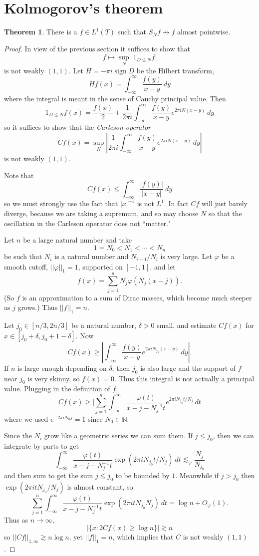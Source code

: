 \documentclass[12pt]{report}
\newcommand{\NN}{\mathbb{N}}
\DeclareMathOperator*{\sgn}{sign}
\newcommand{\dfn}[1]{\emph{#1}\index{#1}}
\theoremstyle{definition}
\newtheorem{theorem}{Theorem}[chapter]
\begin{document}
\section{Kolmogorov's theorem}
\begin{theorem}
There is a $f \in L^1(T)$ such that $S_Nf \not \to f$ almost pointwise.
\end{theorem}
\begin{proof}
In view of the previous section it suffices to show that
$$f \mapsto \sup_N |1_{D \leq N}f|$$
is not weakly $(1, 1)$.
Let $H = -\pi i \sgn D$ be the Hilbert transform,
$$Hf(x) = \int_{-\infty}^\infty \frac{f(y)}{x - y}~dy$$
where the integral is meant in the sense of Cauchy principal value. Then
$$1_{D \leq N}f(x) = \frac{f(x)}{2} + \frac{1}{2\pi i}\int_{-\infty}^\infty \frac{f(y)}{x - y}e^{2\pi iN(x-y)}~dy$$
so it suffices to show that the \dfn{Carleson operator}
$$Cf(x) = \sup_N \left|\frac{1}{2\pi i}\int_{-\infty}^\infty \frac{f(y)}{x - y}e^{2\pi iN(x-y)}~dy\right|$$
is not weakly $(1, 1)$.

Note that
$$Cf(x) \leq \int_{-\infty}^\infty \frac{|f(y)|}{|x - y|}~dy$$
so we must strongly use the fact that $|x|^{-1}$ is not $L^1$. In fact $Cf$ will just barely diverge, because we are taking a supremum, and so may choose $N$ so that the oscillation in the Carleson operator does not ``matter."

Let $n$ be a large natural number and take
$$1 = N_0 < N_1 < \cdots < N_n$$
be such that $N_i$ is a natural number and $N_{i+1}/N_i$ is very large.
Let $\varphi$ be a smooth cutoff, $||\varphi||_1 = 1$, supported on $[-1, 1]$, and let
$$f(x) = \sum_{j=1}^n N_j \varphi(N_j(x-j)).$$
(So $f$ is an approximation to a sum of Dirac masses, which become much steeper as $j$ grows.)
Thus $||f||_1 = n$.

Let $j_0 \in [n/3, 2n/3]$ be a natural number, $\delta > 0$ small, and estimate $Cf(x)$ for $x \in [j_0 + \delta, j_0 + 1 -\delta]$.
Now
$$Cf(x) \geq \left|\int_{-\infty}^\infty \frac{f(y)}{x - y}e^{2\pi iN_{j_0}(x - y)}~dy\right|.$$
If $n$ is large enough depending on $\delta$, then $j_0$ is also large and the support of $f$ near $j_0$ is very skinny, so $f(x) = 0$.
Thus this integral is not actually a principal value. Plugging in the definition of $f$,
$$Cf(x) \geq |\sum_{j=1}^n \int_{-\infty}^\infty \frac{\varphi(t)}{x - j - N_j^{-1}t}e^{2\pi iN_{j_0}t/N_j} ~dt$$
where we used $e^{-2\pi iN_0j} = 1$ since $N_0 \in \NN$.

Since the $N_i$ grow like a geometric series we can sum them. If $j \leq j_0$, then we can integrate by parts to get
$$\int_{-\infty}^\infty \frac{\varphi(t)}{x - j- N_j^{-1}t}\exp(2\pi iN_{j_0}t/N_j)~dt \lesssim_\varphi \frac{N_j}{N_{j_0}}$$
and then sum to get the sum $j \leq j_0$ to be bounded by $1$.
Meanwhile if $j > j_0$ then $\exp(2\pi itN_{j_0}/N_j)$ is almost constant, so
$$\sum_{j=1}^n \int_{-\infty}^\infty \frac{\varphi(t)}{x - j - N_j^{-1}t}\exp(2\pi itN_{j_0}N_j) ~dt = \log n + O_\varphi(1).$$
Thus as $n \to \infty$,
$$|\{x : 2Cf(x) \geq \log n\}| \gtrsim n$$
so $||Cf||_{1, \infty} \gtrsim n \log n$,
yet $||f||_1 = n$, which implies that $C$ is not weakly $(1, 1)$.
\end{proof}
\end{document}
